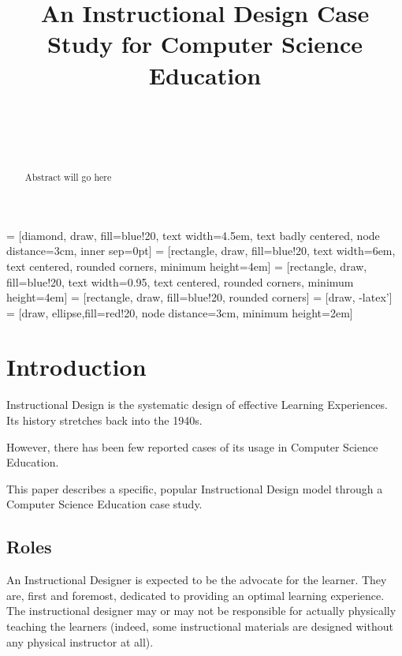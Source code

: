 \documentclass{sig-alternate}
\begin{document}
 = [diamond, draw, fill=blue!20, 
    text width=4.5em, text badly centered, node distance=3cm, inner sep=0pt]
 = [rectangle, draw, fill=blue!20, 
    text width=6em, text centered, rounded corners, minimum height=4em]
 = [rectangle, draw, fill=blue!20, 
    text width=0.95\columnwidth, text centered, rounded corners, minimum height=4em]
 = [rectangle, draw, fill=blue!20, 
    rounded corners]
 = [draw, -latex']
 = [draw, ellipse,fill=red!20, node distance=3cm,
    minimum height=2em]

\title{An Instructional Design Case Study for Computer Science Education}
\author{
	\\
	\\
	  \\
}

\maketitle
\begin{abstract}
Abstract will go here
\end{abstract}




\section{Introduction}

Instructional Design is the systematic design of effective Learning Experiences. 
Its history stretches back into the 1940s.

However, there has been few reported cases of its usage in Computer Science Education.

This paper describes a specific, popular Instructional Design model through a Computer Science Education case study.

\subsection{Roles}
An Instructional Designer is expected to be the advocate for the learner.
They are, first and foremost, dedicated to providing an optimal learning experience.
The instructional designer may or may not be responsible for actually physically teaching the learners (indeed, some instructional materials are designed without any physical instructor at all).
\end{document}
